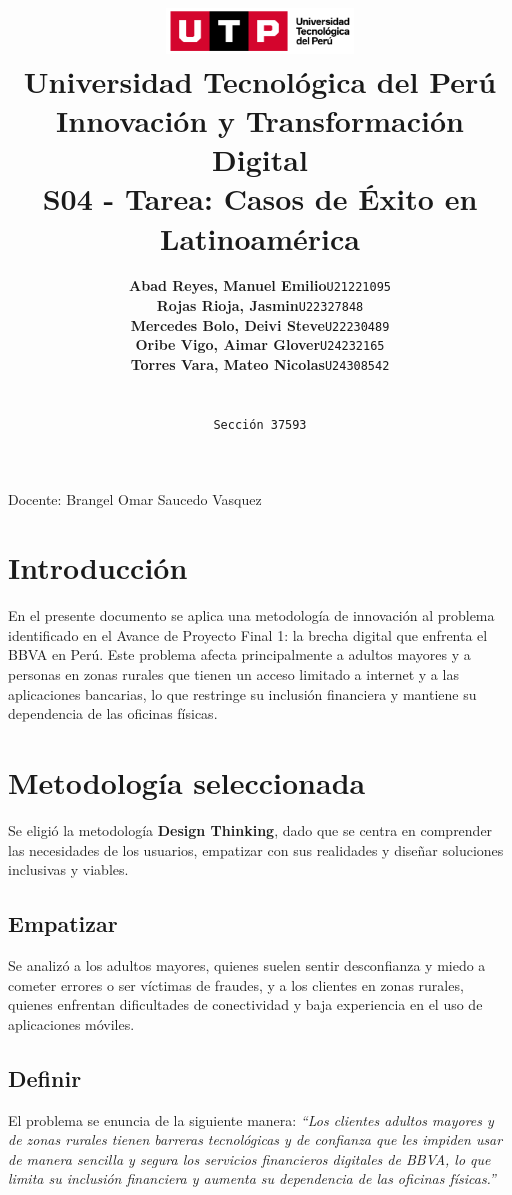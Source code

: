 \documentclass[12pt]{article}
\title{
  \vspace{2cm}
  \pagenumbering{gobble}
  \includegraphics[width=5cm]{../assets/logo-utp.png} \\
  \vspace{1cm}
  \textbf{Universidad Tecnológica del Perú} \\
  \vspace{2cm}
  \textbf{Innovación y Transformación Digital} \\
  \vspace{1cm}
  \large \textbf{S04 - Tarea: Casos de Éxito en Latinoamérica}
}
\author{
  \begin{tabular}{ll}
    \textbf{Abad Reyes, Manuel Emilio} & \texttt{U21221095} \\
    \textbf{Rojas Rioja, Jasmin} & \texttt{U22327848} \\
    \textbf{Mercedes Bolo, Deivi Steve} & \texttt{U22230489} \\
    \textbf{Oribe Vigo, Aimar Glover} & \texttt{U24232165} \\
    \textbf{Torres Vara, Mateo Nicolas} & \texttt{U24308542} \\
  \end{tabular} \\\\
  \texttt{Sección 37593}
}
\begin{document}
\maketitle
\begin{center}

  Docente: Brangel Omar Saucedo Vasquez

\end{center}

%
%

\newpage
{}

\section*{Introducción}
\noindent En el presente documento se aplica una metodología de innovación al problema identificado en el Avance de Proyecto Final 1: la brecha digital que enfrenta el BBVA en Perú. Este problema afecta principalmente a adultos mayores y a personas en zonas rurales que tienen un acceso limitado a internet y a las aplicaciones bancarias, lo que restringe su inclusión financiera y mantiene su dependencia de las oficinas físicas.

\section*{Metodología seleccionada}
\noindent Se eligió la metodología \textbf{Design Thinking}, dado que se centra en comprender las necesidades de los usuarios, empatizar con sus realidades y diseñar soluciones inclusivas y viables.

\subsection*{Empatizar}
\noindent Se analizó a los adultos mayores, quienes suelen sentir desconfianza y miedo a cometer errores o ser víctimas de fraudes, y a los clientes en zonas rurales, quienes enfrentan dificultades de conectividad y baja experiencia en el uso de aplicaciones móviles.

\subsection*{Definir}
\noindent El problema se enuncia de la siguiente manera:  
\emph{“Los clientes adultos mayores y de zonas rurales tienen barreras tecnológicas y de confianza que les impiden usar de manera sencilla y segura los servicios financieros digitales de BBVA, lo que limita su inclusión financiera y aumenta su dependencia de las oficinas físicas.”}
\end{document}
